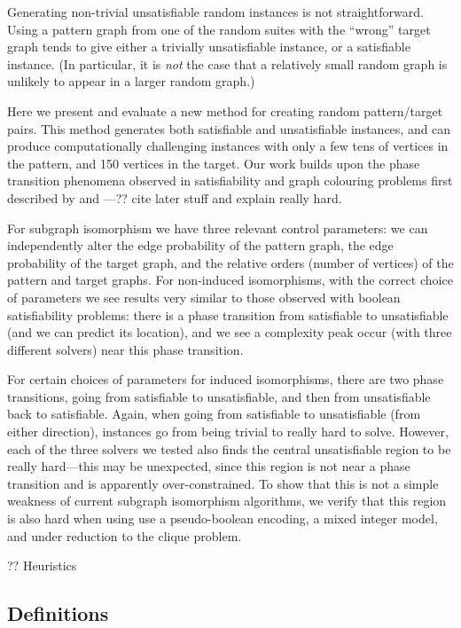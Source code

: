 \documentclass[letterpaper]{article}
\begin{document}
Generating non-trivial unsatisfiable random instances is not straightforward. Using a
pattern graph from one of the random suites with the ``wrong'' target graph tends to give either a
trivially unsatisfiable instance, or a satisfiable instance. (In particular, it is \emph{not} the
case that a relatively small random graph is unlikely to appear in a larger random graph.)

Here we present and evaluate a new method for creating random pattern/target pairs. This method
generates both satisfiable and unsatisfiable instances, and can produce computationally challenging
instances with only a few tens of vertices in the pattern, and 150 vertices in the target. Our work
builds upon the phase transition phenomena observed in satisfiability and graph colouring problems
first described by \citet{Cheeseman:1991} and \citet{Mitchell:1992}---?? cite later stuff and
explain really hard.

For subgraph isomorphism we have three relevant control parameters: we can independently alter the
edge probability of the pattern graph, the edge probability of the target graph, and the relative
orders (number of vertices) of the pattern and target graphs.  For non-induced isomorphisms, with
the correct choice of parameters we see results very similar to those observed with boolean
satisfiability problems: there is a phase transition from satisfiable to unsatisfiable (and we can
predict its location), and we see a complexity peak occur (with three different solvers) near this
phase transition.

For certain choices of parameters for induced isomorphisms, there are two phase transitions, going
from satisfiable to unsatisfiable, and then from unsatisfiable back to satisfiable. Again, when
going from satisfiable to unsatisfiable (from either direction), instances go from being trivial to
really hard to solve. However, each of the three solvers we tested also finds the central
unsatisfiable region to be really hard---this may be unexpected, since this region is not near a
phase transition and is apparently over-constrained. To show that this is not a simple weakness of
current subgraph isomorphism algorithms, we verify that this region is also hard when using use a
pseudo-boolean encoding, a mixed integer model, and under reduction to the clique problem.

?? Heuristics

\subsection{Definitions}
\end{document}
